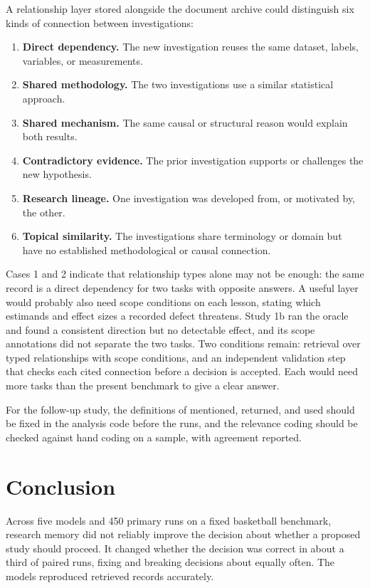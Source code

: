 \documentclass[11pt]{article}
\begin{document}
A relationship layer stored alongside the document archive could distinguish six kinds of connection between investigations:

\begin{enumerate}
\item \textbf{Direct dependency.} The new investigation reuses the same dataset, labels, variables, or measurements.
\item \textbf{Shared methodology.} The two investigations use a similar statistical approach.
\item \textbf{Shared mechanism.} The same causal or structural reason would explain both results.
\item \textbf{Contradictory evidence.} The prior investigation supports or challenges the new hypothesis.
\item \textbf{Research lineage.} One investigation was developed from, or motivated by, the other.
\item \textbf{Topical similarity.} The investigations share terminology or domain but have no established methodological or causal connection.
\end{enumerate}

Cases 1 and 2 indicate that relationship types alone may not be enough: the same record is a direct dependency for two tasks with opposite answers. A useful layer would probably also need scope conditions on each lesson, stating which estimands and effect sizes a recorded defect threatens. Study 1b ran the oracle and found a consistent direction but no detectable effect, and its scope annotations did not separate the two tasks. Two conditions remain: retrieval over typed relationships with scope conditions, and an independent validation step that checks each cited connection before a decision is accepted. Each would need more tasks than the present benchmark to give a clear answer.

For the follow-up study, the definitions of mentioned, returned, and used should be fixed in the analysis code before the runs, and the relevance coding should be checked against hand coding on a sample, with agreement reported.

\section{Conclusion}
\label{sec:conclusion}

Across five models and 450 primary runs on a fixed basketball benchmark, research memory did not reliably improve the decision about whether a proposed study should proceed. It changed whether the decision was correct in about a third of paired runs, fixing and breaking decisions about equally often. The models reproduced retrieved records accurately.
\end{document}
